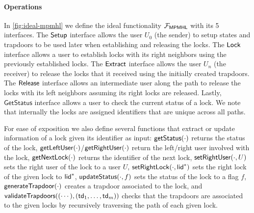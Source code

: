 \paragraph{Operations}
In \cref{fig:ideal-mpmhl} we define the ideal functionality $\mathcal{F}_{\mathsf{MPMHL}}$ with its 5 
interfaces. The $\mathsf{Setup}$ interface allows the user $U_0$ (the sender) to setup states and 
trapdoors to be used later when establishing and releasing the locks. The $\mathsf{Lock}$ interface 
allows a user to establish locks with its right neighbors using the previously established 
locks. The $\mathsf{Extract}$ interface allows the user $U_n$ (the receiver) to release the locks that it 
received using the initially created trapdoors. The $\mathsf{Release}$ interface allows an intermediate 
user along the path to release the locks with its left neighbors assuming its right locks are 
released. Lastly, $\mathsf{GetStatus}$ interface allows a user to check the current status of 
a lock. We note that internally the locks are assigned identifiers that are unique across all 
paths.

For ease of exposition we also define several functions that extract or update information of 
a lock given its identifier as input: $\mathsf{getStatus}(\cdot)$ returns the status of the lock, 
$\mathsf{getLeftUser}(\cdot)$/$\mathsf{getRightUser}(\cdot)$ return the left/right user involved with the 
lock, $\mathsf{getNextLock}(\cdot)$ returns the identifier of the next lock, $\mathsf{setRightUser}(\cdot, U)$ 
sets the right user of the lock to a user $U$, $\mathsf{setRightLock}(\cdot, \mathsf{lid}^*)$ sets the right lock 
of the given lock to $\mathsf{lid}^*$, $\mathsf{updateStatus}(\cdot, f)$ sets the status of the lock to a flag 
$f$, $\mathsf{generateTrapdoor}(\cdot)$ creates a trapdoor associated to the lock, and 
$\mathsf{validateTrapdoors}((\cdots), (\mathsf{td}_1,\ldots,\mathsf{td}_m))$ checks that the trapdoors are associated 
to the given locks by recursively traversing the path of each given lock.

